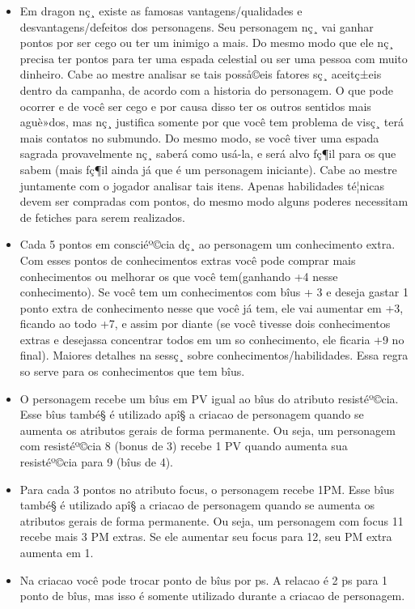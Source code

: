 \begin{itemize}
	\item Em dragon nç¸ existe as famosas vantagens/qualidades e desvantagens/defeitos dos personagens. Seu personagem nç¸ vai ganhar pontos por ser cego ou ter um inimigo a mais. Do mesmo modo que ele nç¸ precisa ter pontos para ter uma espada celestial ou ser uma pessoa com muito dinheiro. Cabe ao mestre analisar se tais posså©eis fatores sç¸ aceitç±eis dentro da campanha, de acordo com a historia do personagem.
O que pode ocorrer e de você ser cego e por causa disso ter os outros sentidos mais aguè»dos, mas nç¸ justifica somente por que você tem problema de visç¸ terá mais contatos no submundo. Do mesmo modo, se você tiver uma espada sagrada provavelmente nç¸ saberá como usá-la, e será alvo fç¶il para os que sabem (mais fç¶il ainda já que é um personagem iniciante). Cabe ao mestre juntamente com o jogador analisar tais itens. Apenas habilidades té¦nicas devem ser compradas com pontos, do mesmo modo alguns poderes necessitam de fetiches para serem realizados.
	\item Cada 5 pontos em consciéº©cia dç¸ ao personagem um conhecimento extra. Com esses pontos de conhecimentos extras você pode comprar mais conhecimentos ou melhorar os que você tem(ganhando +4 nesse conhecimento). Se você tem um conhecimentos com bîus + 3 e deseja gastar 1 ponto extra de conhecimento nesse que você já tem, ele vai aumentar em +3, ficando ao todo +7, e assim por diante (se você tivesse dois conhecimentos extras e desejassa concentrar todos em um so conhecimento, ele ficaria +9 no final). Maiores detalhes na sessç¸ sobre conhecimentos/habilidades. Essa regra so serve para os conhecimentos que tem bîus.
 	\item O personagem recebe um bîus em PV igual ao bîus do atributo resistéº©cia. Esse bîus també§ é utilizado apî§ a criacao de personagem quando se aumenta os atributos gerais de forma permanente. Ou seja, um personagem com resistéº©cia 8 (bonus de 3) recebe 1 PV quando aumenta sua resistéº©cia para 9 (bîus de 4).
	\item  Para cada 3 pontos no atributo focus, o personagem recebe 1PM. Esse bîus també§ é utilizado apî§ a criacao de personagem quando se aumenta os atributos gerais de forma permanente. Ou seja, um personagem com focus 11 recebe mais 3 PM extras. Se ele aumentar seu focus para 12, seu PM extra aumenta em 1.
	\item Na criacao você pode trocar ponto de bîus por ps. A relacao é 2 ps para 1 ponto de bîus, mas isso é somente utilizado durante a criacao de personagem.

\end{itemize}
